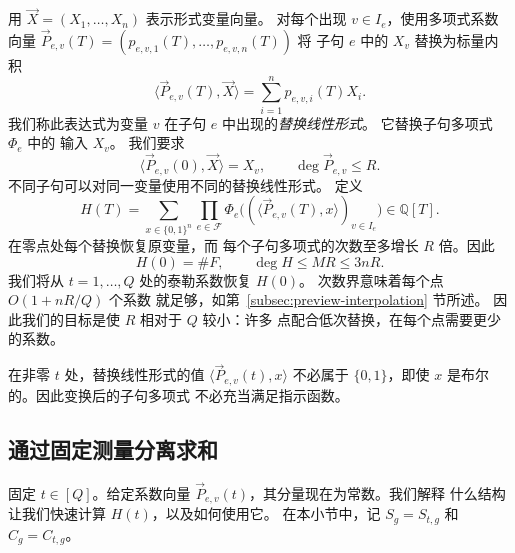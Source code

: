 \documentclass[11pt,reqno]{amsart}
\numberwithin{equation}{section}
\theoremstyle{definition}\newtheorem{definition}[theorem]{定义}
\theoremstyle{remark}\newtheorem{remark}[theorem]{注}
\renewcommand{\le}{\leqslant}
\begin{document}
用 $\vec{X}=(X_1,\ldots,X_n)$ 表示形式变量向量。
对每个出现 $v\in I_e$，使用多项式系数向量
$\vec{P}_{e,v}(T)=(p_{e,v,1}(T),\ldots,p_{e,v,n}(T))$ 将
子句 $e$ 中的 $X_v$ 替换为标量内积
\[
 \langle \vec{P}_{e,v}(T),\vec{X}\rangle
 =\sum_{i=1}^n p_{e,v,i}(T)X_i.
\]
我们称此表达式为变量 $v$ 在子句 $e$ 中出现的\emph{替换线性形式}。
它替换子句多项式 $\Phi_e$ 中的
输入 $X_v$。
我们要求
\[
 \langle \vec{P}_{e,v}(0),\vec{X}\rangle=X_v,
 \qquad \deg \vec{P}_{e,v}\le R.
\]
不同子句可以对同一变量使用不同的替换线性形式。
定义
\begin{equation}\label{eq:simple-counting-polynomial}
 H(T)=\sum_{x\in\{0,1\}^n}\prod_{e\in\mathcal F}
       \Phi_e\bigl((\langle \vec{P}_{e,v}(T), x\rangle)_{v\in I_e}\bigr)
       \in\mathbb Q[T].
\end{equation}
在零点处每个替换恢复原变量，而
每个子句多项式的次数至多增长 $R$ 倍。因此
\begin{equation}\label{eq:overview-value-degree}
 H(0)=\#F,\qquad \deg H\le MR\le3nR.
\end{equation}
我们将从 $t=1,\ldots,Q$ 处的泰勒系数恢复 $H(0)$。
次数界意味着每个点 $O(1+nR/Q)$ 个系数
就足够，如第~\ref{subsec:preview-interpolation} 节所述。
因此我们的目标是使 $R$ 相对于 $Q$ 较小：许多
点配合低次替换，在每个点需要更少的系数。

在非零 $t$ 处，替换线性形式的值 $\langle\vec{P}_{e,v}(t),x\rangle$
不必属于 $\{0,1\}$，即使
$x$ 是布尔的。因此变换后的子句多项式
不必充当满足指示函数。

\subsection{通过固定测量分离求和}
\label{subsec:preview-separation}
固定 $t\in[Q]$。给定系数向量
$\vec{P}_{e,v}(t)$，其分量现在为常数。我们解释
什么结构让我们快速计算 $H(t)$，以及如何使用它。
在本小节中，记 $S_g=S_{t,g}$ 和 $C_g=C_{t,g}$。
\end{document}
